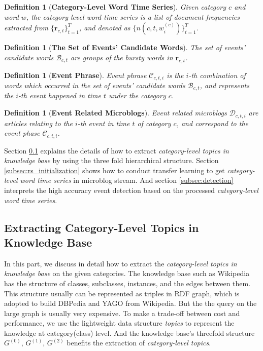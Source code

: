 \documentclass[runningheads,a4paper]{llncs}
\theoremstyle{exampstyle}
\newtheorem{rmkWithoutSpacing}[thm]{Definition}
\begin{document}
\begin{rmkWithoutSpacing}[\textbf{Category-Level Word Time Series}] 
Given category \(c\) and word \(w\), the category level word time series is a list of document frequencies extracted from \(\{\bm{r}_{c,t}\}_{t=1}^{T}\), and denoted as \(\{n(c,t,w^{(c)}_{i})\}_{t=1}^{T}\).
\end{rmkWithoutSpacing}


\begin{rmkWithoutSpacing}[\textbf{The Set of Events' Candidate Words}] 
The set of events' candidate words \(\mathcal{B}_{c,t}\) are groups of the bursty words in \(\bm{r}_{c,t}\).
\end{rmkWithoutSpacing}

\begin{rmkWithoutSpacing}[\textbf{Event Phrase}] 
Event phrase \(\mathcal{C}_{c,t,i}\) is the \(i\)-th combination of words which occurred in the set of events' candidate words \(\mathcal{B}_{c,t}\), and represents the \(i\)-th event happened in time \(t\) under the category \(c\).
\end{rmkWithoutSpacing}

\begin{rmkWithoutSpacing}[\textbf{Event Related Microblogs}] Event related microblogs \(\mathcal{D}_{c,t,i}\) are articles relating to the \(i\)-th event in time \(t\) of category \(c\), and correspond to the event phase \(\mathcal{C}_{c,t,i}\).
\end{rmkWithoutSpacing}


Section \ref{subsec:hs_initialization} explains the details of how to extract \textit{category-level topics in knowledge base} by using the three fold hierarchical structure.
Section \ref{subsec:rs_initialization} shows how to conduct transfer learning to get \textit{category-level word time series} in microblog stream.
And section \ref{subsec:detection} interprets the high accuracy event detection based on the processed \textit{category-level word time series}.

\subsection{Extracting Category-Level Topics in Knowledge Base}\label{subsec:hs_initialization}
In this part, we discuss in detail how to extract the \textit{category-level topics in knowledge base} on the given categories. 
The knowledge base such as Wikipedia has the structure of classes, subclasses, instances, and the edges between them. 
This structure usually can be represented as triples in RDF graph\cite{klyne2006rdf}, which is adopted to build DBPedia\cite{auer2007dbpedia} and YAGO\cite{suchanek2007yago} from Wikipedia. 
But the the query on the large graph is usually very expensive\cite{huang2011scalable}. 
To make a trade-off between cost and performance, we use the lightweight data structure \textit{topics} to represent the knowledge at category(class) level.
And the knowledge base's threefold structure \(G^{(0)}\), \(G^{(1)}\), \(G^{(2)}\) benefits the extraction of \textit{category-level topics}. 
\end{document}
